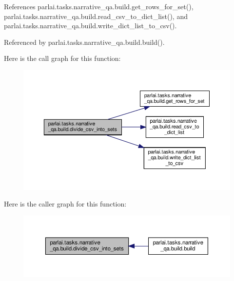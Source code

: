 References parlai.\+tasks.\+narrative\+\_\+qa.\+build.\+get\+\_\+rows\+\_\+for\+\_\+set(), parlai.\+tasks.\+narrative\+\_\+qa.\+build.\+read\+\_\+csv\+\_\+to\+\_\+dict\+\_\+list(), and parlai.\+tasks.\+narrative\+\_\+qa.\+build.\+write\+\_\+dict\+\_\+list\+\_\+to\+\_\+csv().



Referenced by parlai.\+tasks.\+narrative\+\_\+qa.\+build.\+build().

Here is the call graph for this function\+:
\nopagebreak
\begin{figure}[H]
\begin{center}
\leavevmode
\includegraphics[width=350pt]{namespaceparlai_1_1tasks_1_1narrative__qa_1_1build_a104cbf949215e7b505c73b33017b1970_cgraph}
\end{center}
\end{figure}
Here is the caller graph for this function\+:
\nopagebreak
\begin{figure}[H]
\begin{center}
\leavevmode
\includegraphics[width=350pt]{namespaceparlai_1_1tasks_1_1narrative__qa_1_1build_a104cbf949215e7b505c73b33017b1970_icgraph}
\end{center}
\end{figure}
\mbox{\label{namespaceparlai_1_1tasks_1_1narrative__qa_1_1build_afd6f28e1efb7e9f3328eef166f8be5cb}} 
